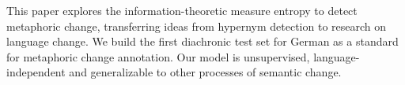 This paper explores the information-theoretic measure entropy to detect metaphoric change, transferring ideas from hypernym detection to research on language change. We build the first diachronic test set for German as a standard for metaphoric change annotation. Our model is unsupervised, language-independent and generalizable to other processes of semantic change.
